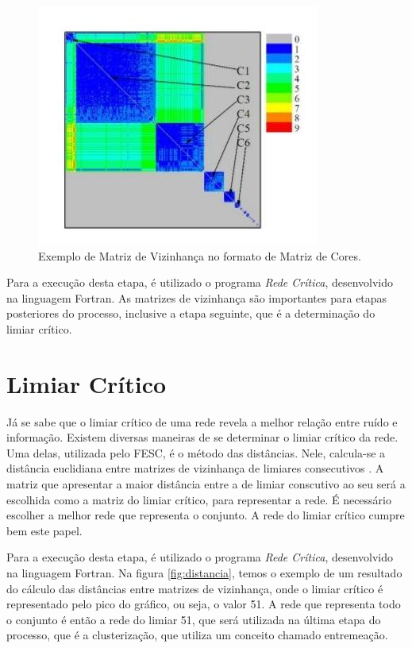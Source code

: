 \begin{figure}
\centering
\includegraphics[scale=0.53]{matriz-vizinhanca}
\caption{Exemplo de Matriz de Vizinhança no formato de Matriz de Cores.}
\label{fig:matriz-vizinhanca}
\end{figure}

Para a execução desta etapa, é utilizado o programa \textit{Rede Crítica}, desenvolvido na linguagem Fortran. As matrizes de vizinhança são importantes para
etapas posteriores do processo, inclusive a etapa seguinte, que é a determinação do limiar crítico.

\section{Limiar Crítico} \label{sec:limcrit}

Já se sabe que o limiar crítico de uma rede revela a melhor relação entre ruído e informação. Existem diversas maneiras de se determinar o limiar
crítico da rede. Uma delas, utilizada pelo FESC, é o método das distâncias. Nele, calcula-se a distância euclidiana entre matrizes de vizinhança
de limiares consecutivos \cite{andrade2008}. A matriz que apresentar a maior distância entre a de limiar conscutivo
ao seu será a escolhida como a matriz do limiar crítico, para representar a rede. É necessário escolher a melhor rede que representa o conjunto.
A rede do limiar crítico cumpre bem este papel.

Para a execução desta etapa, é utilizado o programa \textit{Rede Crítica}, desenvolvido na linguagem Fortran. Na figura \ref{fig:distancia}, temos o
exemplo de um resultado do cálculo das distâncias entre matrizes de vizinhança, onde o limiar crítico é representado pelo pico do gráfico, ou seja,
o valor 51. A rede que representa todo o conjunto é então a rede do limiar 51, que será utilizada na última etapa do processo, que é a clusterização,
que utiliza um conceito chamado entremeação.

